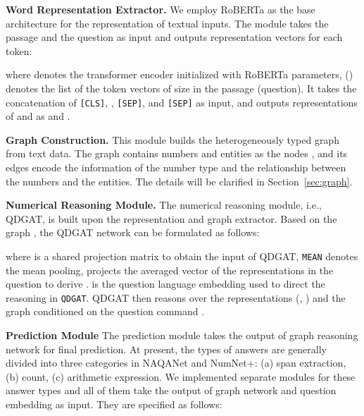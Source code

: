 \documentclass{article}
\begin{document}
{\bf Word Representation Extractor.}
We employ RoBERTa \cite{DBLP:journals/corr/abs-1907-11692} as the base architecture for the representation of textual inputs.
The module takes the passage  and the question  as input and outputs representation vectors for each token:

where  denotes the transformer encoder initialized with RoBERTa  parameters, 
 () denotes the list of the token vectors of size  in the passage (question).
It takes the concatenation of \texttt{[CLS]}, , \texttt{[SEP]},  and \texttt{[SEP]} as input, and outputs representations of  and  as  and .  

{\bf Graph Construction.}
This module builds the heterogeneously typed graph from text data. The graph  contains numbers  and entities  as the nodes , and its edges  encode the information of the number type and the relationship between the numbers and the entities. 
The details will be clarified in Section~\ref{sec:graph}.




{\bf Numerical Reasoning Module.}
The numerical reasoning module, i.e., QDGAT, is built upon the representation and graph extractor.
Based on the graph , the QDGAT network can be formulated as follows:

where  is a shared projection matrix to obtain the input of QDGAT, \texttt{MEAN} denotes the mean pooling,  projects the averaged vector of the representations in the question to derive .
 is the question language embedding used to direct the reasoning in \texttt{QDGAT}.
QDGAT then reasons over the representations (, ) and the graph  conditioned on the question command .



{\bf Prediction Module}
The prediction module takes the output of graph reasoning network  for final prediction.
At present, the types of answers are generally divided into three categories in NAQANet and NumNet+: (a) span extraction, (b) count, (c) arithmetic expression.
We implemented separate modules for these answer types and all of them take the output of graph network  and question embedding  as input.
They are specified as follows:
\end{document}
